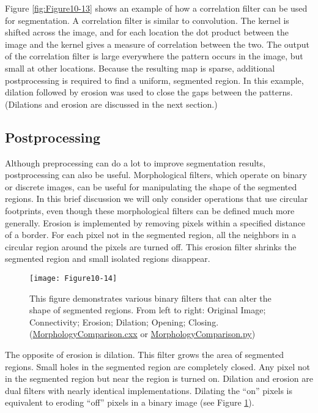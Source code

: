 Figure \ref{fig:Figure10-13} shows an example of how a correlation filter can be used for segmentation. A correlation filter is similar to convolution. The kernel is shifted across the image, and for each location the dot product between the image and the kernel gives a measure of correlation between the two. The output of the correlation filter is large everywhere the pattern occurs in the image, but small at other locations. Because the resulting map is sparse, additional postprocessing is required to find a uniform, segmented region. In this example, dilation followed by erosion was used to close the gaps between the patterns. (Dilations and erosion are discussed in the next section.)

\subsection{Postprocessing}

Although preprocessing can do a lot to improve segmentation results, postprocessing can also be useful. Morphological filters, which operate on binary or discrete images, can be useful for manipulating the shape of the segmented regions. In this brief discussion we will only consider operations that use circular footprints, even though these morphological filters can be defined much more generally. Erosion is implemented by removing pixels within a specified distance of a border. For each pixel not in the segmented region, all the neighbors in a circular region around the pixels are turned off. This erosion filter shrinks the segmented region and small isolated regions disappear.

\begin{figure}[!htb]
	\centering
	\texttt{[image: Figure10-14]}
	\caption{This figure demonstrates various binary filters that can alter the shape of segmented regions. From left to right: Original Image; Connectivity; Erosion; Dilation; Opening; Closing. (\href{https://lorensen.github.io/VTKExamples/site/Cxx/ImageProcessing/MorphologyComparison/}{MorphologyComparison.cxx} or \href{https://lorensen.github.io/VTKExamples/site/Python/ImageProcessing/MorphologyComparison/}{MorphologyComparison.py})}
	\label{fig:Figure10-14}
\end{figure}

The opposite of erosion is dilation. This filter grows the area of segmented regions. Small holes in the segmented region are completely closed. Any pixel not in the segmented region but near the region is turned on. Dilation and erosion are dual filters with nearly identical implementations. Dilating the ``on'' pixels is equivalent to eroding ``off'' pixels in a binary image (see Figure \ref{fig:Figure10-14}).

